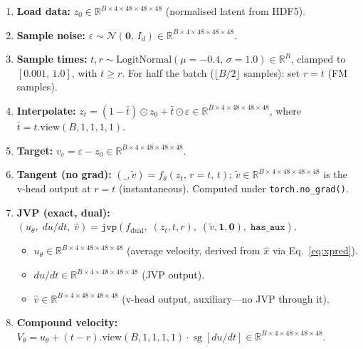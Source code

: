 \documentclass[11pt,a4paper]{article}
\newcommand{\code}[1]{\texttt{#1}}
\DeclareMathOperator{\sg}{sg}        %
\begin{document}
\begin{enumerate}[nosep, leftmargin=2em]
  \item \textbf{Load data:}
    $z_0 \in \mathbb{R}^{B \times 4 \times 48 \times 48 \times 48}$
    (normalised latent from HDF5).

  \item \textbf{Sample noise:}
    $\varepsilon \sim \mathcal{N}(\mathbf{0},\,I_d)
    \in \mathbb{R}^{B \times 4 \times 48 \times 48 \times 48}$.

  \item \textbf{Sample times:}
    $t, r \sim \mathrm{LogitNormal}(\mu{=}{-0.4},\,\sigma{=}1.0)
    \in \mathbb{R}^B$,
    clamped to $[0.001,\,1.0]$, with $t \ge r$.
    For half the batch ($\lfloor B/2 \rfloor$ samples): set $r = t$
    (FM samples).

  \item \textbf{Interpolate:}
    $z_t = (1-\bar{t})\odot z_0 + \bar{t}\odot\varepsilon
    \in \mathbb{R}^{B \times 4 \times 48 \times 48 \times 48}$,
    where $\bar{t} = t.\mathrm{view}(B,1,1,1,1)$.

  \item \textbf{Target:}
    $v_c = \varepsilon - z_0
    \in \mathbb{R}^{B \times 4 \times 48 \times 48 \times 48}$.

  \item \textbf{Tangent (no grad):}
    $(\_, \tilde{v}) = f_\theta(z_t,\,r{=}t,\,t)$;
    $\tilde{v} \in \mathbb{R}^{B \times 4 \times 48 \times 48 \times 48}$
    is the v-head output at $r{=}t$ (instantaneous).
    Computed under \code{torch.no\_grad()}.

  \item \textbf{JVP (exact, dual):}
    $(u_\theta,\;du/dt,\;\hat{v}) =
    \texttt{jvp}(f_{\mathrm{dual}},\;(z_t,t,r),\;(\tilde{v},\mathbf{1},\mathbf{0}),\;
    \texttt{has\_aux})$.
    \begin{itemize}[nosep]
      \item $u_\theta \in \mathbb{R}^{B \times 4 \times 48 \times 48 \times 48}$
        (average velocity, derived from $\hat{x}$ via Eq.~\ref{eq:xpred}).
      \item $du/dt \in \mathbb{R}^{B \times 4 \times 48 \times 48 \times 48}$
        (JVP output).
      \item $\hat{v} \in \mathbb{R}^{B \times 4 \times 48 \times 48 \times 48}$
        (v-head output, auxiliary---no JVP through it).
    \end{itemize}

  \item \textbf{Compound velocity:}
    $V_\theta = u_\theta + (t-r).\mathrm{view}(B,1,1,1,1) \cdot \sg[du/dt]
    \in \mathbb{R}^{B \times 4 \times 48 \times 48 \times 48}$.


\end{enumerate}
\end{document}
